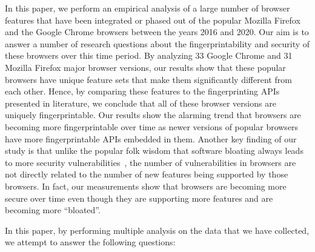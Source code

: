 In this paper, we perform an empirical analysis of a large number of
browser features that have been integrated or phased out of the
popular Mozilla Firefox and the Google Chrome browsers between the
years 2016 and 2020. Our aim is to answer a number of research
questions about the fingerprintability and security of these browsers
over this time period. By analyzing 33 Google Chrome and 31 Mozilla
Firefox major browser versions, our results show that these popular
browsers have unique feature sets that make them significantly
different from each other. Hence, by comparing these features to the
fingerprinting APIs presented in literature, we conclude that all of
these browser versions are uniquely fingerprintable. Our results show
the alarming trend that browsers are becoming more fingerprintable
over time as newer versions of popular browsers have more
fingerprintable APIs embedded in them. Another key finding of our
study is that unlike the popular folk wisdom that software bloating
always leads to more security vulnerabilities~\cite{Bloating}, the
number of vulnerabilities in browsers are not directly related to the
number of new features being supported by those browsers. In fact, our
measurements show that browsers are becoming more secure over time
even though they are supporting more features and are becoming more
``bloated''.

In this paper, by performing multiple analysis on the data that we
have collected, we attempt to answer the following questions:

